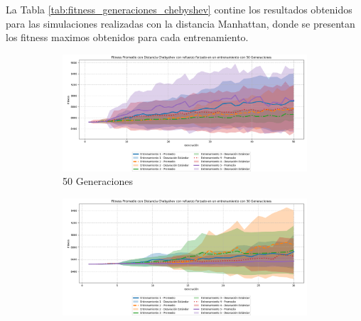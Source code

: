 \documentclass[lettersize, journal]{IEEEtran}
\begin{document}

La Tabla \ref{tab:fitness_generaciones_chebyshev} contine los resultados obtenidos para las simulaciones realizadas con la distancia Manhattan, donde se presentan los fitness maximos obtenidos para cada entrenamiento.

\begin{figure}[ht]
    \centering
    \begin{subfigure}{0.3\textwidth}
        \centering
        \includegraphics[width=\textwidth]{Chebyshev/Fitness_Acumulado_Cheby_50Gen.png}
        \caption{50 Generaciones}
        \label{fig:cheb_50gen}
    \end{subfigure}
    \hfill
    \begin{subfigure}{0.3\textwidth}
        \centering
        \includegraphics[width=\textwidth]{Chebyshev/Fitness_Acumulado_Cheby30Gen.png}

\end{subfigure}
\end{figure}
\end{document}
